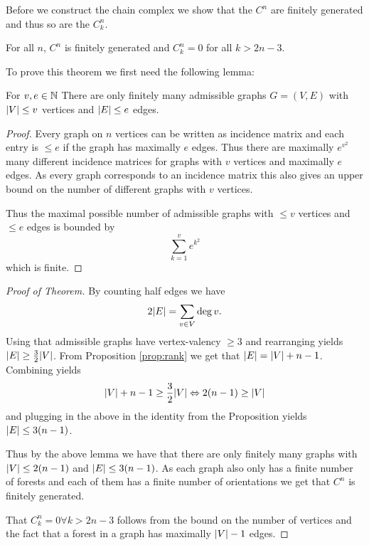 Before we construct the chain complex we show that the $C^{n}$ are finitely generated and thus so are the $C_{k}^{n}$.

\begin{theorem}\label{thm:finGenCn}
	For all $n$, $C^{n}$ is finitely generated and $C_{k}^{n} = 0$ for all $k > 2n-3$. 
\end{theorem}

To prove this theorem we first need the following lemma:
\begin{lemma}
	For $v,e \in \mathbb{N}$ There are only finitely many admissible graphs $G = (V,E)$ with $\abs{V} \leq v$ vertices and $ \abs{E} \leq e$ edges.
\end{lemma}

\begin{proof}
	Every graph on $n$ vertices can be written as incidence matrix and each entry is $\leq e$ if the graph has maximally $e$ edges. 
	Thus there are maximally $e^{v^2}$ many different incidence matrices for graphs with  $v$ vertices and maximally $e$ edges.
	As every graph corresponds to an incidence matrix this also gives an upper bound on the number of different graphs with $v$ vertices.

	Thus the maximal possible number of admissible graphs with $\leq v$ vertices and $\leq e$ edges is bounded by
	\[
		\sum_{k=1}^{v} e^{k^2} 
	\]
	which is finite.
\end{proof}

\begin{proof}[Proof of Theorem]
	By counting half edges we have
	\[
		2 \abs{E} = \sum_{v \in V} \deg{v}
	.\] 
	Using that admissible graphs have vertex-valency $\geq 3$ and rearranging yields $\abs{E} \geq \frac{3}{2} \abs{V}$.
	From Proposition \ref{prop:rank} we get that $\abs{E} = \abs{V} + n-1$.
	Combining yields
	\[
		\abs{V} + n -1 \geq \frac{3}{2} \abs{V} \Leftrightarrow 2 (n-1) \geq \abs{V}
	\] 
	and plugging in the above in the identity from the Proposition yields $\abs{E} \leq 3 (n-1)$.

	Thus by the above lemma we have that there are only finitely many graphs with $\abs{V} \leq 2 (n-1)$ and $\abs{E} \leq 3(n-1)$.
	As each graph also only has a finite number of forests and each of them has a finite number of orientations we get that
	$C^{n}$ is finitely generated.

	That $C_{k}^{n} = 0 \forall k > 2n -3$ follows from the bound on the number of vertices and the fact that a forest in a graph has maximally $\abs{V} - 1$ edges.
\end{proof}

